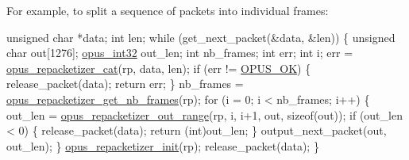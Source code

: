 For example, to split a sequence of packets into individual frames\+: 
\begin{DoxyCode}
\textcolor{keywordtype}{unsigned} \textcolor{keywordtype}{char} *data;
\textcolor{keywordtype}{int} len;
\textcolor{keywordflow}{while} (get\_next\_packet(&data, &len))
\{
  \textcolor{keywordtype}{unsigned} \textcolor{keywordtype}{char} out[1276];
  \hyperlink{opus__types_8h_aa4d309d6f80b99dbabebc8f98879ab9a}{opus\_int32} out\_len;
  \textcolor{keywordtype}{int} nb\_frames;
  \textcolor{keywordtype}{int} err;
  \textcolor{keywordtype}{int} i;
  err = \hyperlink{group__opus__repacketizer_ga2840dd56bfa37f8c6874355b9ce8fb46}{opus\_repacketizer\_cat}(rp, data, len);
  \textcolor{keywordflow}{if} (err != \hyperlink{group__opus__errorcodes_gaa44cf8a185e1b5cb940ef63eb4f02d21}{OPUS\_OK})
  \{
    release\_packet(data);
    \textcolor{keywordflow}{return} err;
  \}
  nb\_frames = \hyperlink{group__opus__repacketizer_ga2cad98d04458aafdf6bb9f22f34ea7c0}{opus\_repacketizer\_get\_nb\_frames}(rp);
  \textcolor{keywordflow}{for} (i = 0; i < nb\_frames; i++)
  \{
    out\_len = \hyperlink{group__opus__repacketizer_gac591b550d92125b4abfa11a4b609f51f}{opus\_repacketizer\_out\_range}(rp, i, i+1, out, \textcolor{keyword}{sizeof}(out));
    \textcolor{keywordflow}{if} (out\_len < 0)
    \{
       release\_packet(data);
       \textcolor{keywordflow}{return} (\textcolor{keywordtype}{int})out\_len;
    \}
    output\_next\_packet(out, out\_len);
  \}
  \hyperlink{group__opus__repacketizer_gab42ff7c3f8a49ff5029fcf60f3b853f0}{opus\_repacketizer\_init}(rp);
  release\_packet(data);
\}
\end{DoxyCode}


